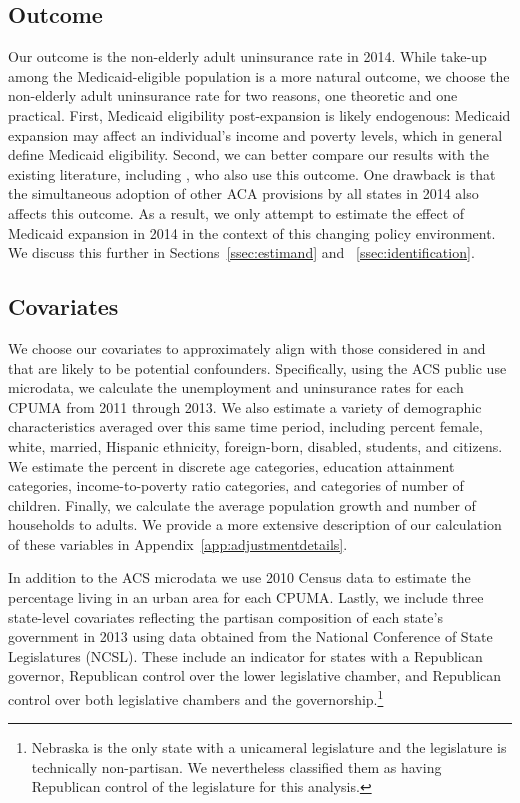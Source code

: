 \documentclass[aoas]{imsart}
\theoremstyle{plain}
\theoremstyle{remark}
\begin{document}
\subsection{Outcome}

Our outcome is the non-elderly adult uninsurance rate in 2014. While take-up among the Medicaid-eligible population is a more natural outcome, we choose the non-elderly adult uninsurance rate for two reasons, one theoretic and one practical. First, Medicaid eligibility post-expansion is likely endogenous: Medicaid expansion may affect an individual's income and poverty levels, which in general define Medicaid eligibility. Second, we can better compare our results with the existing literature, including \cite{courtemanche2017early}, who also use this outcome. One drawback is that the simultaneous adoption of other ACA provisions by all states in 2014 also affects this outcome. As a result, we only attempt to estimate the effect of Medicaid expansion in 2014 in the context of this changing policy environment. We discuss this further in Sections~\ref{ssec:estimand} and ~\ref{ssec:identification}. 

\subsection{Covariates}

We choose our covariates to approximately align with those considered in \cite{courtemanche2017early} and that are likely to be potential confounders. Specifically, using the ACS public use microdata, we calculate the unemployment and uninsurance rates for each CPUMA from 2011 through 2013. We also estimate a variety of demographic characteristics averaged over this same time period, including percent female, white, married, Hispanic ethnicity, foreign-born, disabled, students, and citizens. We estimate the percent in discrete age categories, education attainment categories, income-to-poverty ratio categories, and categories of number of children. Finally, we calculate the average population growth and number of households to adults. We provide a more extensive description of our calculation of these variables in Appendix~\ref{app:adjustmentdetails}.

In addition to the ACS microdata we use 2010 Census data to estimate the percentage living in an urban area for each CPUMA. Lastly, we include three state-level covariates reflecting the partisan composition of each state's government in 2013 using data obtained from the National Conference of State Legislatures (NCSL). These include an indicator for states with a Republican governor, Republican control over the lower legislative chamber, and Republican control over both legislative chambers and the governorship.\footnote{Nebraska is the only state with a unicameral legislature and the legislature is technically non-partisan. We nevertheless classified them as having Republican control of the legislature for this analysis.} 
\end{document}
